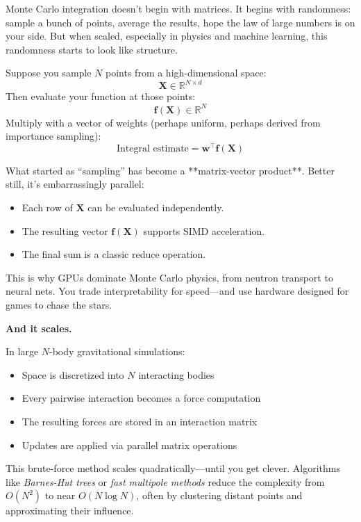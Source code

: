 Monte Carlo integration doesn't begin with matrices. It begins with randomness: sample a bunch of points, average the results, hope the law of large numbers is on your side. But when scaled, especially in physics and machine learning, this randomness starts to look like structure.

Suppose you sample \( N \) points from a high-dimensional space:  
\[
\mathbf{X} \in \mathbb{R}^{N \times d}
\]
Then evaluate your function at those points:  
\[
\mathbf{f}(\mathbf{X}) \in \mathbb{R}^{N}
\]
Multiply with a vector of weights (perhaps uniform, perhaps derived from importance sampling):  
\[
\text{Integral estimate} = \mathbf{w}^\top \mathbf{f}(\mathbf{X})
\]

What started as “sampling” has become a **matrix-vector product**. Better still, it’s embarrassingly parallel:
\begin{itemize}
  \item Each row of \( \mathbf{X} \) can be evaluated independently.
  \item The resulting vector \( \mathbf{f(X)} \) supports SIMD acceleration.
  \item The final sum is a classic reduce operation.
\end{itemize}

This is why GPUs dominate Monte Carlo physics, from neutron transport to neural nets. You trade interpretability for speed—and use hardware designed for games to chase the stars.

\vspace{1em}

\textbf{And it scales.}

In large \( N \)-body gravitational simulations:
\begin{itemize}
  \item Space is discretized into \( N \) interacting bodies
  \item Every pairwise interaction becomes a force computation
  \item The resulting forces are stored in an interaction matrix
  \item Updates are applied via parallel matrix operations
\end{itemize}

This brute-force method scales quadratically—until you get clever. Algorithms like \textit{Barnes-Hut trees} or \textit{fast multipole methods} reduce the complexity from \( O(N^2) \) to near \( O(N \log N) \), often by clustering distant points and approximating their influence.

